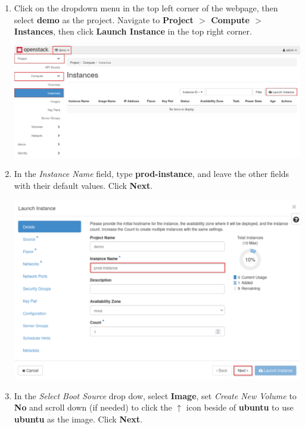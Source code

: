 \documentclass[letterpaper, 12pt]{article}
\begin{document}
\begin{enumerate}
    \item Click on the dropdown menu in the top left corner of the webpage, then select \textbf{demo} as the project.
    Navigate to \textbf{Project $>$ Compute $>$ Instances}, then click \textbf{Launch Instance} in the top right corner.

    \begin{center}
        \includegraphics[width=\linewidth]{images/part1/step5.png}
    \end{center}

    \item In the \textit{Instance Name} field, type \textbf{prod-instance}, and leave the other fields with their
    default values. Click \textbf{Next}.

    \begin{center}
        \includegraphics[width=\linewidth]{images/part1/step6.png}
    \end{center}

    \item In the \textit{Select Boot Source} drop dow, select \textbf{Image}, set \textit{Create New Volume} to
    \textbf{No} and scroll down (if needed) to click the $\uparrow$ icon beside of \textbf{ubuntu} to use
    \textbf{ubuntu} as the image. Click \textbf{Next}.


\end{enumerate}
\end{document}
